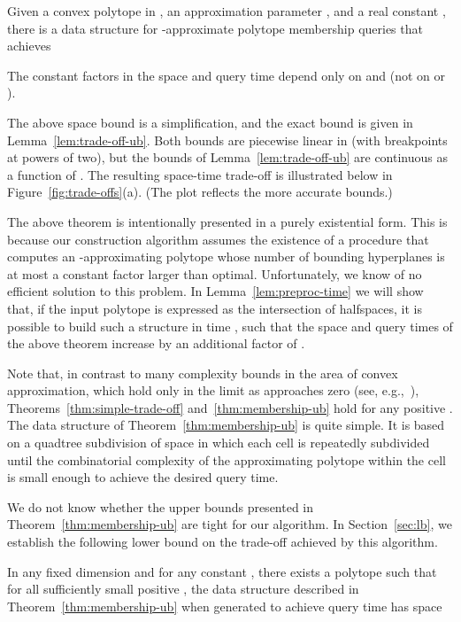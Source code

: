 \documentclass[11pt]{article}   \usepackage[letterpaper,hmargin=2.1cm,vmargin=3cm]{geometry}
\begin{document}
\begin{theorem} \label{thm:membership-ub}
Given a convex polytope  in , an approximation parameter , and a real constant , there is a data structure for  -approximate polytope membership queries that achieves

The constant factors in the space and query time depend only on  and  (not on  or ).
\end{theorem}


The above space bound is a simplification, and the exact bound is given in Lemma~\ref{lem:trade-off-ub}. Both bounds are piecewise linear in  (with breakpoints at powers of two), but the bounds of Lemma~\ref{lem:trade-off-ub} are continuous as a function of . The resulting space-time trade-off is illustrated below in Figure~\ref{fig:trade-offs}(a). (The plot reflects the more accurate bounds.) 

The above theorem is intentionally presented in a purely existential form. This is because our construction algorithm assumes the existence of a procedure that computes an -approximating polytope whose number of bounding hyperplanes is at most a constant factor larger than optimal. Unfortunately, we know of no efficient solution to this problem. In Lemma~\ref{lem:preproc-time} we will show that, if the input polytope is expressed as the intersection of  halfspaces, it is possible to build such a structure in time , such that the space and query times of the above theorem increase by an additional factor of .

Note that, in contrast to many complexity bounds in the area of convex approximation, which hold only in the limit as  approaches zero (see, e.g.,~\cite{Gru93,Bor00}), Theorems~\ref{thm:simple-trade-off} and~\ref{thm:membership-ub} hold for any positive . The data structure of Theorem~\ref{thm:membership-ub} is quite simple. It is based on a quadtree subdivision of space in which each cell is repeatedly subdivided until the combinatorial complexity of the approximating polytope within the cell is small enough to achieve the desired query time. 

We do not know whether the upper bounds presented in Theorem~\ref{thm:membership-ub} are tight for our algorithm. In Section~\ref{sec:lb}, we establish the following lower bound on the trade-off achieved by this algorithm.

\begin{theorem} \label{thm:lb}
In any fixed dimension  and for any constant , there exists a polytope such that for all sufficiently small positive , the data structure described in Theorem~\ref{thm:membership-ub} when generated to achieve query time  has space

\end{theorem}
\end{document}

